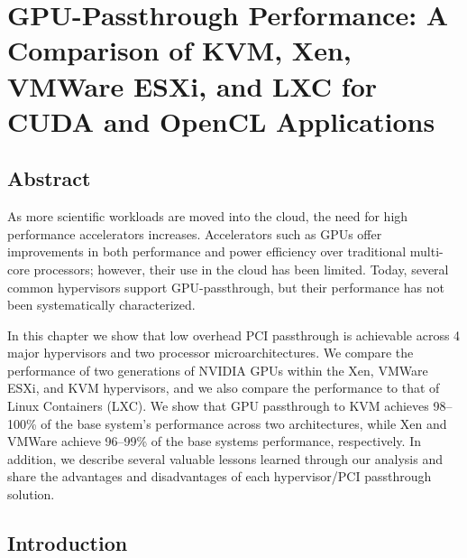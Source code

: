 
\chapter{GPU-Passthrough Performance: A Comparison of KVM, Xen, VMWare ESXi, and LXC for CUDA and OpenCL Applications}
\label{chap:cloud2014}


\section{Abstract}
As more scientific workloads are moved into the cloud, the need for high
performance accelerators increases.  Accelerators such as GPUs offer
improvements in both performance and power efficiency over traditional
multi-core processors; however, their use in the cloud has been limited.  Today,
several common hypervisors support GPU-passthrough, but their performance has
not been systematically characterized.  

In this chapter we show that low overhead PCI passthrough is achievable across 4
major hypervisors and two processor microarchitectures. We compare the performance of two generations of NVIDIA
GPUs within the Xen, VMWare ESXi, and KVM hypervisors, and we also compare the
performance to that of Linux Containers (LXC). We show that GPU passthrough to
KVM achieves 98--100\% of the base system's performance across two
architectures, while Xen and VMWare achieve 96--99\% of the base systems
performance, respectively.   In addition, we describe several
valuable lessons learned through our analysis and share the
advantages and disadvantages of each hypervisor/PCI passthrough solution. 


\section{Introduction}

